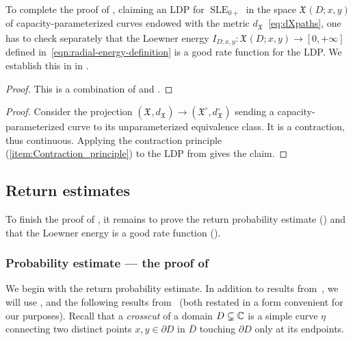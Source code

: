 \documentclass[a4paper, 11pt]{article}
\theoremstyle{definition}
\numberwithin{equation}{section}
\numberwithin{figure}{section}
\newcommand{\SLE}[1][]{\operatorname{SLE}_{#1}}
\newcommand{\lenergy}[2]{I_{#1;#2}}
\newcommand{\Xpaths}[1][]{\mathfrak{X}_{#1}}
\newcommand{\unparampaths}{\Xpaths[]^\circ}%
\newcommand{\dXpaths}[1][]{d_{\Xpaths[#1]}}
\newcommand{\dXpathsUnparam}{d_{\Xpaths}^\circ}%
\begin{document}
To complete the proof of , 
claiming an LDP for $\SLE[0+]$ in the space $\Xpaths(D;x,y)$ of capacity-parameterized curves endowed with the metric $\dXpaths$~\eqref{eq:dXpaths}, 
one has to check separately that the Loewner energy 
$\lenergy{D}{x,y} \colon \Xpaths(D;x,y) \to [0,+\infty]$ defined in~\eqref{eqn:radial-energy-definition} is a good rate function for the LDP.
We establish this in  in .

\radialLDP*
\begin{proof}
This is a combination of  and .
\end{proof}

\unparamLDP*

\begin{proof}
Consider the projection $(\Xpaths, \dXpaths) \to (\unparampaths, \dXpathsUnparam)$ sending a capacity-parameterized curve 
to its unparameterized equivalence class. 
It is a contraction, thus continuous. 
Applying the contraction principle (\ref{item:Contraction_principle}) to the LDP from  gives the claim.
\end{proof} 

\subsection{Return estimates}\label{subsec:return-estimates}

To finish the proof of , it remains to prove the return probability estimate () and that the Loewner energy is a good rate function ().

\subsubsection{Probability estimate --- the proof of }


We begin with the return probability estimate. 
In addition to results from~\cite{Lawler:Continuity_of_radial_and_two-sided_radial_SLE_at_the_terminal_point, Field-Lawler:Escape_probability_and_transience_for_SLE}, 
we will use , and the following results from~\cite{Lawler:Continuity_of_radial_and_two-sided_radial_SLE_at_the_terminal_point,Peltola-Wang:LDP} (both restated in a form convenient for our purposes).
Recall that a \emph{crosscut} of a domain $D \subsetneq \mathbb{C}$ is a simple curve $\eta$ connecting two distinct points $x,y \in \partial D$ in $\overline{D}$ touching $\partial D$ only at its endpoints. 
\end{document}
